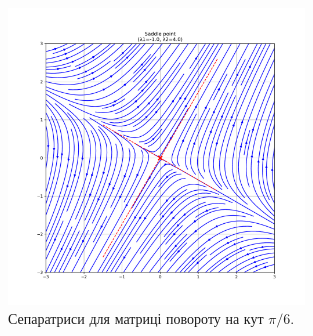 \documentclass[oneside,solution]{tmpl}
\begin{document}
\begin{figure}[H]
    \centering
    \includegraphics[width=0.7\textwidth]{images/exam/exam_problem_2_2.pdf}
    \caption{Сепаратриси для матриці повороту на кут $\pi/6$.}
    \label{fig:problem_2_addition}
\end{figure}
\end{document}
